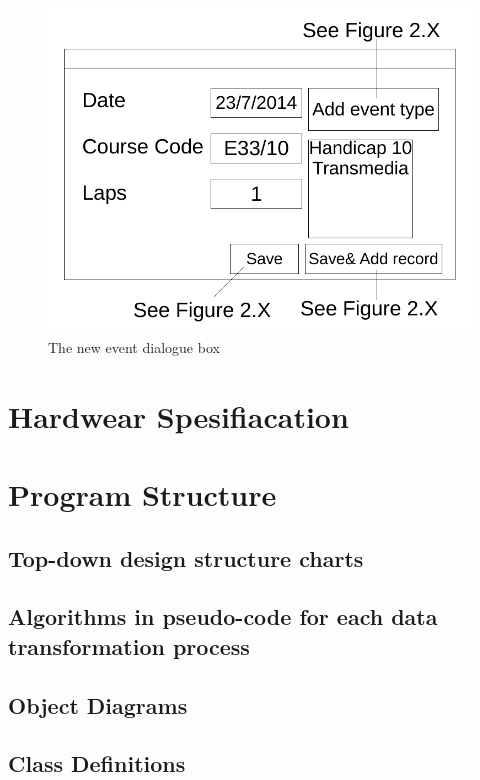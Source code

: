 \begin{figure}[H]
	\includegraphics[width=\textwidth]{./UI Design/NewEventDialog.pdf}
	\caption{The new event dialogue box} \label{fig:The new event dialogue box}
\end{figure}
\section{Hardwear Spesifiacation}

\section{Program Structure}

\subsection{Top-down design structure charts}

\subsection{Algorithms in pseudo-code for each data transformation process}

\subsection{Object Diagrams}

\subsection{Class Definitions}

